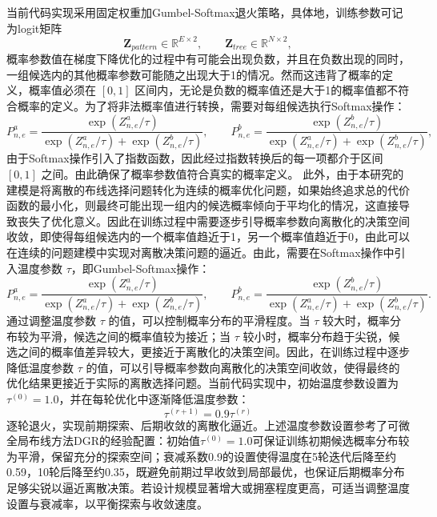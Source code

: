 当前代码实现采用固定权重加Gumbel-Softmax退火策略，具体地，训练参数可记为logit矩阵
\begin{equation}
    \mathbf{Z}_{pattern}\in\mathbb{R}^{E\times 2},\qquad
    \mathbf{Z}_{tree}\in\mathbb{R}^{N\times 2},
\end{equation}
概率参数值在梯度下降优化的过程中有可能会出现负数，并且在负数出现的同时，一组候选内的其他概率参数可能随之出现大于1的情况。然而这违背了概率的定义，概率值必须在 $[0,1]$ 区间内，无论是负数的概率值还是大于1的概率值都不符合概率的定义。为了将非法概率值进行转换，需要对每组候选执行Softmax操作：
\begin{equation}
    P_{n,e}^{a}=\frac{\exp(Z_{n,e}^{a}/\tau)}{\exp(Z_{n,e}^{a}/\tau)+\exp(Z_{n,e}^{b}/\tau)},\qquad
    P_{n,e}^{b}=\frac{\exp(Z_{n,e}^{b}/\tau)}{\exp(Z_{n,e}^{a}/\tau)+\exp(Z_{n,e}^{b}/\tau)},
\end{equation}
由于Softmax操作引入了指数函数，因此经过指数转换后的每一项都介于区间 $[0,1]$ 之间。由此确保了概率参数值符合真实的概率定义。
此外，由于本研究的建模是将离散的布线选择问题转化为连续的概率优化问题，如果始终追求总的代价函数的最小化，则最终可能出现一组内的候选概率倾向于平均化的情况，这直接导致丧失了优化意义。因此在训练过程中需要逐步引导概率参数向离散化的决策空间收敛，即使得每组候选内的一个概率值趋近于1，另一个概率值趋近于0，由此可以在连续的问题建模中实现对离散决策问题的逼近。由此，需要在Softmax操作中引入温度参数 $\tau$，即Gumbel-Softmax操作：
\begin{equation}
    P_{n,e}^{a}=\frac{\exp(Z_{n,e}^{a}/\tau)}{\exp(Z_{n,e}^{a}/\tau)+\exp(Z_{n,e}^{b}/\tau)},\qquad
    P_{n,e}^{b}=\frac{\exp(Z_{n,e}^{b}/\tau)}{\exp(Z_{n,e}^{a}/\tau)+\exp(Z_{n,e}^{b}/\tau)}.
\end{equation}
通过调整温度参数 $\tau$ 的值，可以控制概率分布的平滑程度。当 $\tau$ 较大时，概率分布较为平滑，候选之间的概率值较为接近；当 $\tau$ 较小时，概率分布趋于尖锐，候选之间的概率值差异较大，更接近于离散化的决策空间。因此，在训练过程中逐步降低温度参数 $\tau$ 的值，可以引导概率参数向离散化的决策空间收敛，使得最终的优化结果更接近于实际的离散选择问题。当前代码实现中，初始温度参数设置为 $\tau^{(0)}=1.0$，并在每轮优化中逐渐降低温度参数：
\begin{equation}
    \tau^{(r+1)}=0.9\tau^{(r)}
\end{equation}
逐轮退火，实现前期探索、后期收敛的离散化逼近。上述温度参数设置参考了可微全局布线方法DGR的经验配置：初始值$\tau^{(0)}=1.0$可保证训练初期候选概率分布较为平滑，保留充分的探索空间；衰减系数0.9的设置使得温度在5轮迭代后降至约0.59，10轮后降至约0.35，既避免前期过早收敛到局部最优，也保证后期概率分布足够尖锐以逼近离散决策。若设计规模显著增大或拥塞程度更高，可适当调整温度设置与衰减率，以平衡探索与收敛速度。

